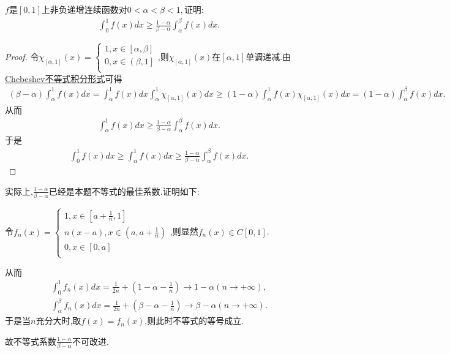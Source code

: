 \documentclass[lang=cn,newtx,10pt,scheme=chinese]{elegantbook}
\begin{document}
\begin{example}
$f$是$[0,1]$上非负递增连续函数对$0 < \alpha < \beta < 1,$证明:
\begin{gather}
  \int_{0}^{1} f(x) dx \geq \frac{1 - \alpha}{\beta - \alpha} \int_{\alpha}^{\beta} f(x) dx.
  \nonumber
\end{gather}
\end{example}
\begin{proof}
  令$\chi _{\left[ \alpha ,1 \right]}\left( x \right) =\begin{cases}
    1,x\in \left[ \alpha ,\beta \right]\\
    0,x\in \left( \beta ,1 \right]\\
\end{cases}$,则$\chi _{\left[ \alpha ,1 \right]}\left( x \right)$在$[\alpha,1]$单调递减.由\hyperref[Accumulation of mathematical techniques-Chebeshev不等式积分形式]{Chebeshev不等式积分形式}可得
  \begin{align*}
    \left( \beta -\alpha \right) \int_{\alpha}^1{f(x)dx}=\int_{\alpha}^1{f(x)dx\int_{\alpha}^1{\chi _{\left[ \alpha ,1 \right]}\left( x \right) dx}}\geqslant \left( 1-\alpha \right) \int_{\alpha}^1{f\left( x \right) \chi _{\left[ \alpha ,1 \right]}\left( x \right) dx}=\left( 1-\alpha \right) \int_{\alpha}^{\beta}{f\left( x \right) dx}.
    \nonumber
  \end{align*}
  从而
  \begin{align*}
    \int_{\alpha}^1{f(x)dx}\geqslant \frac{1-\alpha}{\beta -\alpha}\int_{\alpha}^{\beta}{f\left( x \right) dx}.
    \nonumber
  \end{align*}
  于是
  \begin{align*}
    \int_0^1{f(x)dx}\geqslant \int_{\alpha}^1{f(x)dx}\geqslant \frac{1-\alpha}{\beta -\alpha}\int_{\alpha}^{\beta}{f\left( x \right) dx}.
    \nonumber
  \end{align*}
\end{proof}
\begin{remark}
  实际上,$\frac{1-\alpha}{\beta -\alpha}$已经是本题不等式的最佳系数.证明如下:
  
  令$f_n\left( x \right) =\begin{cases}
    1,x\in \left[ a+\frac{1}{n},1 \right]\\
    n\left( x-a \right) ,x\in \left( a,a+\frac{1}{n} \right)\\
    0,x\in \left[ 0,a \right]\\
  \end{cases}$,则显然$f_n(x)\in C[0,1]$.
  
  从而
  \begin{align*}
    \int_0^1{f_n\left( x \right) dx}=\frac{1}{2n}+\left( 1-\alpha -\frac{1}{n} \right) \rightarrow 1-\alpha \left( n\rightarrow +\infty \right) ,
\\
\int_{\alpha}^{\beta}{f_n\left( x \right) dx}=\frac{1}{2n}+\left( \beta -\alpha -\frac{1}{n} \right) \rightarrow \beta -\alpha \left( n\rightarrow +\infty \right) .
    \nonumber
  \end{align*}
  于是当$n$充分大时,取$f(x)=f_n(x)$,则此时不等式的等号成立.

  故不等式系数$\frac{1-\alpha}{\beta -\alpha}$不可改进.
\end{remark}
\end{document}
